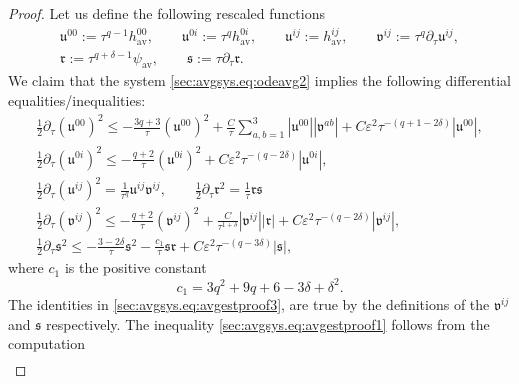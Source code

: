 \documentclass[10pt,a4paper]{amsart}
\newcommand{\av}{\mathrm{av}}
\newcommand{\mf}{\mathfrak}
\newcommand{\pa}{\partial}
\newcommand{\ve}{\varepsilon}
\begin{document}
\begin{proof}
    Let us define the following rescaled functions
    \begin{subequations}
        \begin{gather}
            \mf{u}^{00}:= \tau^{q-1}h_{\av}^{00},\qquad \mf{u}^{0i}:= \tau^{q}h_{\av}^{0i},\qquad
            \mf{u}^{ij}:= h_{\av}^{ij},\qquad \mf{v}^{ij}:= \tau^q\pa_\tau\mf{u}^{ij},\\ \mf{r}:= \tau^{q+\delta-1}\psi_{\av},\qquad \mf{s}:=\tau\pa_\tau \mf{r}.
        \end{gather}
    \end{subequations}
    We claim that the system \eqref{sec:avgsys.eq:odeavg2} implies the following differential equalities/inequalities:
    \begin{subequations}
        \begin{gather}
            \frac{1}{2}\pa_\tau (\mf{u}^{00})^2 \leq -\frac{3q+3}{\tau}(\mf{u}^{00})^2 + \frac{C}{\tau}\sum_{a,b=1}^3|\mf{u}^{00}||\mf{v}^{ab}| + C\ve^2\tau^{-(q+1-2\delta)}|\mf{u}^{00}|,\label{sec:avgsys.eq:avgestproof1}\\
            \frac{1}{2}\pa_\tau(\mf{u}^{0i})^2 \leq-\frac{q+2}{\tau}(\mf{u}^{0i})^2 + C\ve^2\tau^{-(q-2\delta)}|\mf{u}^{0i}|,\label{sec:avgsys.eq:avgestproof2}\\
            \frac{1}{2}\pa_\tau(\mf{u}^{ij})^2 = \frac{1}{\tau^{q}}\mf{u}^{ij}\mf{v}^{ij},\qquad \frac{1}{2}\pa_\tau \mf{r}^2 =\frac{1}{\tau}\mf{r}\mf{s}\label{sec:avgsys.eq:avgestproof3}\\
            \frac{1}{2}\pa_\tau (\mf{v}^{ij})^2 \leq - \frac{q+2}{\tau}(\mf{v}^{ij})^2 + \frac{C}{\tau^{1+\delta}}|\mf{v}^{ij}||\mf{r}| + C\ve^2 \tau^{-(q-2\delta)}|\mf{v}^{ij}|,\label{sec:avgsys.eq:avgestproof4}\\
            \frac{1}{2}\pa_\tau \mf{s}^2 \leq -\frac{3-2\delta}{\tau}\mf{s}^2 - \frac{c_1}{\tau}\mf{s}\mf{r} + C\ve^2\tau^{-(q-3\delta)}|\mf{s}|,\label{sec:avgsys.eq:avgestproof5}
        \end{gather}
    \end{subequations}
    where $c_1$ is the positive constant
    \begin{equation}
        c_1 = 3q^2+9q+6-3\delta+\delta^2.
    \end{equation}
    The identities in \eqref{sec:avgsys.eq:avgestproof3}, are true by the definitions of the $\mf{v}^{ij}$ and $\mf{s}$ respectively. The inequality \eqref{sec:avgsys.eq:avgestproof1} follows from the computation
    \begin{align}

\end{align}
\end{proof}
\end{document}
